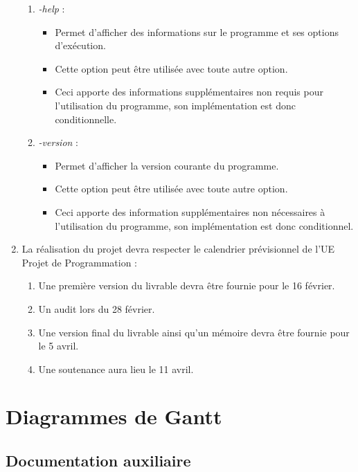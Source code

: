 \documentclass[12pt]{article}
\begin{document}
\begin{enumerate}
\begin{enumerate}
\item \textit{-help} :
\begin{itemize}
\item Permet d'afficher des informations sur le programme et ses options d'exécution. 
\item Cette option peut être utilisée avec toute autre option. 
\item Ceci apporte des informations supplémentaires non requis pour l'utilisation du programme, son implémentation est donc conditionnelle.\\
\end{itemize}

\item \textit{-version} :
\begin{itemize}
\item Permet d'afficher la version courante du programme.
\item Cette option peut être utilisée avec toute autre option. 
\item Ceci apporte des information supplémentaires non nécessaires à l'utilisation du programme, son implémentation est donc conditionnel.\\
\end{itemize}

\end{enumerate}


\item La réalisation du projet devra respecter le calendrier prévisionnel de l'UE Projet de Programmation :
\begin{enumerate}
\item \label {besoinNF6a}Une première version du livrable devra être fournie pour le 16 février.
\item Un audit lors du 28 février.
\item \label {besoinNF6c}Une version final du livrable ainsi qu'un mémoire devra être fournie pour le 5 avril.
\item Une soutenance aura lieu le 11 avril.
\end{enumerate}

\end{enumerate}

\newpage
\section{Diagrammes de Gantt}

\subsection{Documentation auxiliaire}
\vspace{6em}
\end{document}
